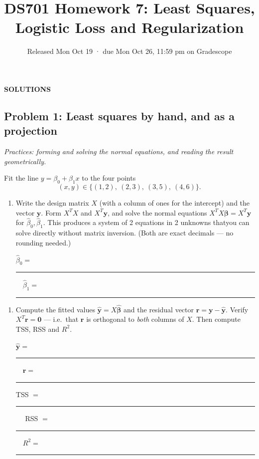\documentclass[
  11pt,
]{article}
\title{DS701 Homework 7: Least Squares, Logistic Loss and
Regularization}
\subtitle{Released Mon Oct 19 · due Mon Oct 26, 11:59 pm on Gradescope}
\author{}
\date{}
\newcommand{\answerspace}[1]{\par\vspace*{#1}}  %
\newcommand{\blank}[1][1.2in]{\rule{#1}{0.4pt}}
\newcommand{\answerpage}{\clearpage}
\begin{document}
\maketitle


\begin{center}\LARGE\bfseries\color{blue!45!black} SOLUTIONS\end{center}
\renewcommand{\answerspace}[1]{}
\renewcommand{\answerpage}{\par\vspace{6pt}}

\answerpage

\subsection{Problem 1: Least squares by hand, and as a
projection}\label{problem-1-least-squares-by-hand-and-as-a-projection}

\emph{Practices: forming and solving the normal equations, and reading
the result geometrically.}

Fit the line \(y = \beta_0 + \beta_1 x\) to the four points
\[(x, y) \in \{(1, 2),\ (2, 3),\ (3, 5),\ (4, 6)\}.\]

\begin{enumerate}
\def\labelenumi{(\alph{enumi})}
\item
  Write the design matrix \(X\) (with a column of ones for the
  intercept) and the vector \(\mathbf{y}\). Form \(X^TX\) and
  \(X^T\mathbf{y}\), and solve the normal equations
  \(X^TX\boldsymbol\beta = X^T\mathbf{y}\) for
  \(\hat\beta_0, \hat\beta_1\). This produces a system of 2 equations in
  2 unknowns thatyou can solve directly without matrix inversion. (Both
  are exact decimals --- no rounding needed.)

  \(\hat\beta_0 =\) \blank[0.8in] \(\quad \hat\beta_1 =\) \blank[0.8in]
\end{enumerate}

\answerspace{3in}

\begin{enumerate}
\def\labelenumi{(\alph{enumi})}
\setcounter{enumi}{1}
\item
  Compute the fitted values
  \(\hat{\mathbf y} = X\hat{\boldsymbol\beta}\) and the residual vector
  \(\mathbf r = \mathbf y - \hat{\mathbf y}\). Verify
  \(X^T\mathbf r = \mathbf 0\) --- i.e.~that \(\mathbf r\) is orthogonal
  to \emph{both} columns of \(X\). Then compute TSS, RSS and \(R^2\).

  \(\hat{\mathbf y} =\) \blank[2in] \(\quad \mathbf r =\)
  \blank[1.8in]TSS \(=\) \blank[0.8in] \(\quad\) RSS \(=\)
  \blank[0.8in] \(\quad R^2 =\) \blank[0.8in]
\end{enumerate}
\end{document}
